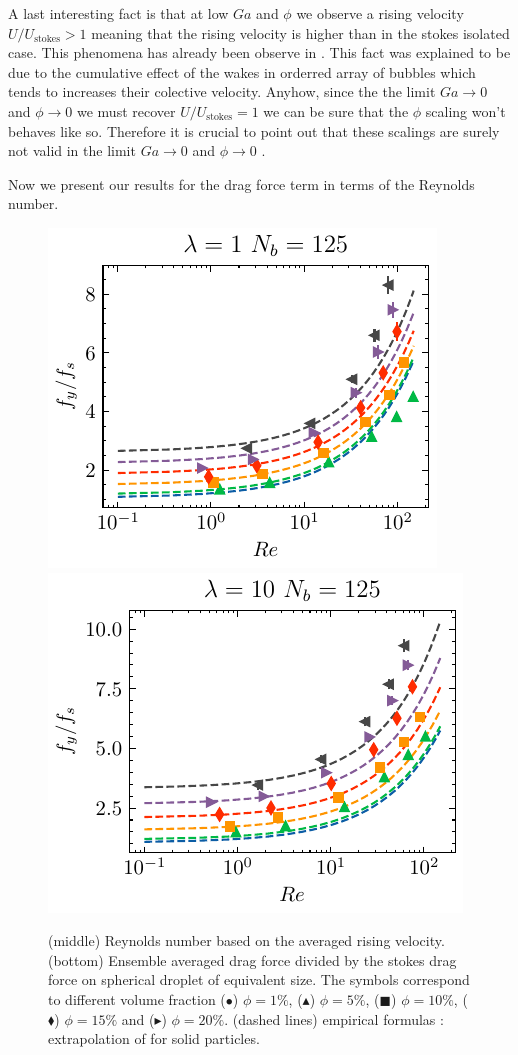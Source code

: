 A last interesting fact is that at low $Ga$ and $\phi$ we observe a rising velocity $U / U_\text{stokes} > 1$ meaning that the rising velocity is higher than in the stokes isolated case. 
This phenomena has already been observe in \citet{loisy2017buoyancy}. 
This fact was explained to be due to the cumulative effect of the wakes in orderred array of bubbles  which tends to increases their colective velocity. 
Anyhow, since the the limit $Ga \rightarrow 0$ and $\phi \rightarrow 0$ we must recover $U/U_\text{stokes} = 1$ we can be sure that the $\phi$ scaling won't behaves like so.
Therefore it is crucial to point out that these scalings are surely not valid in the limit  $Ga \rightarrow 0$ and $\phi \rightarrow 0$ .





Now we present our results for the drag force term in terms of the Reynolds number. 
\begin{figure}[h!]
    \centering
    \includegraphics[height = 0.35\textwidth]{image/HOMOGENEOUS/fCA/Fstokes_N_5_l_1.pdf}
    \includegraphics[height = 0.35\textwidth]{image/HOMOGENEOUS/fCA/Fstokes_N_5_l_10.pdf}
    \caption{
        (middle) Reynolds number based on the averaged rising velocity.
    (bottom) Ensemble averaged drag force divided by the stokes drag force on spherical droplet of equivalent size.
    The symbols correspond to different volume fraction ($\bullet$) $\phi = 1\%$, ($\blacktriangle$) $\phi = 5\%$, ($\blacksquare$) $\phi = 10\%$, ($\blacklozenge$) $\phi = 15\%$ and ($\blacktriangleright$) $\phi = 20\%$.
    (dashed lines) empirical formulas : extrapolation of  \citet{tenneti2011drag} for solid particles. }
    \label{fig:drag_force}
\end{figure}

